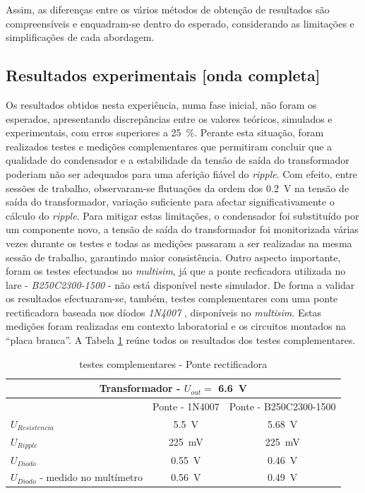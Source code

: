 Assim, as diferenças entre os vários métodos de obtenção de resultados são compreensíveis e enquadram-se dentro do esperado, considerando as limitações e simplificações de cada abordagem.

\subsection{Resultados experimentais [onda completa]}
\label{sec:resultados_RectificadoresOndacompleta}
Os resultados obtidos nesta experiência, numa fase inicial, não foram os esperados, apresentando discrepâncias entre os valores teóricos, simulados e experimentais, com erros superiores a \SI{25}{\percent}. Perante esta situação, foram realizados testes e medições complementares que permitiram concluir que a qualidade do condensador e a estabilidade da tensão de saída do transformador poderiam não ser adequados para uma aferição fiável do \textit{ripple}. Com efeito, entre sessões de trabalho, observaram-se flutuações da ordem dos \SI{0.2}{\volt} na tensão de saída do transformador, variação suficiente para afectar significativamente o cálculo do \textit{ripple}. Para mitigar estas limitações, o condensador foi substituído por um componente novo, a tensão de saída do transformador foi monitorizada várias vezes durante os testes e todas as medições passaram a ser realizadas na mesma sessão de trabalho, garantindo maior consistência.
Outro aspecto importante, foram os testes efectuados no \textit{multisim}, já que a ponte recficadora utilizada no \acrshort{lare} - \textit{B250C2300-1500} \cite{B250C2306} - não está disponível neste simulador. De forma a validar os resultados efectuaram-se, também, testes complementares com uma ponte rectificadora baseada nos díodos \textit{1N4007} \cite{1N400x}, disponíveis no \textit{multisim}. Estas medições foram realizadas em contexto laboratorial e os circuitos montados na ``placa branca''.
A Tabela \ref{Table:testespontes} reúne todos os resultados dos testes complementares.

\begin{table}[htb]
\centering
\caption{testes complementares - Ponte rectificadora} 
\label{Table:testespontes}
\begin{tabular}{lcc}
\toprule
\multicolumn{3}{c}{Transformador - $U_{out} = $ \SI{6.6}{\volt}} \\
\midrule
 & Ponte - 1N4007 & Ponte - B250C2300-1500 \\
\midrule
$U_{Resistencia}$ & \SI{5.5}{\volt} & \SI{5.68}{\volt} \\
\midrule
$U_{Ripple}$ & \SI{225}{\milli\volt} & \SI{225}{\milli\volt} \\
\midrule
$U_{Diodo}$ & \SI{0.55}{\volt} & \SI{0.46}{\volt} \\
\midrule
$U_{Diodo}$ - medido no multímetro & \SI{0.56}{\volt} & \SI{0.49}{\volt} \\
\bottomrule
\end{tabular}
\end{table}

